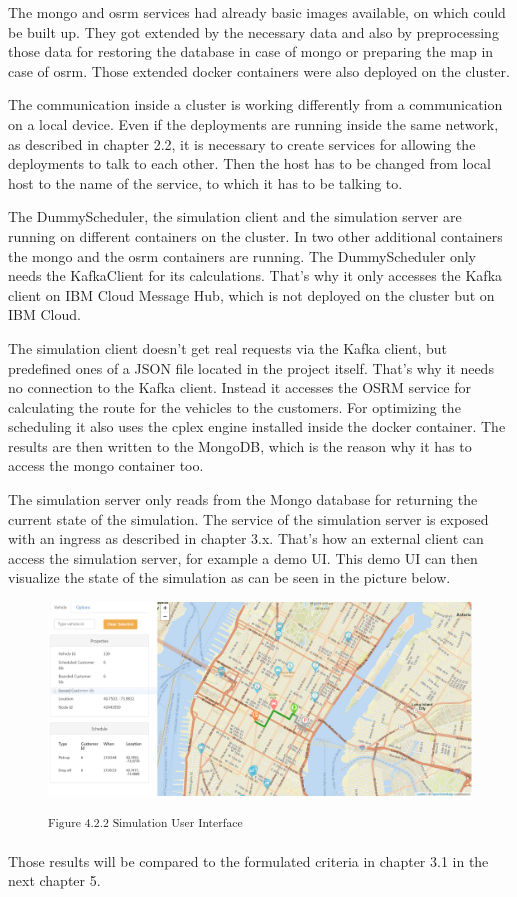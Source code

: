 The mongo and osrm services had already basic images available, on which could be built up. They got extended by the necessary data and also by preprocessing those data for restoring the database in case of mongo or preparing the map in case of osrm. Those extended docker containers were also deployed on the cluster.

The communication inside a cluster is working differently from a communication on a local device. Even if the deployments are running inside the same network, as described in chapter 2.2, it is necessary to create services for allowing the deployments to talk to each other. Then the host has to be changed from local host to the name of the service, to which it has to be talking to.


The DummyScheduler, the simulation client and the simulation server are running on different containers on the cluster. In two other additional containers the mongo and the osrm containers are running. The DummyScheduler only needs the KafkaClient for its calculations. That's why it only accesses the Kafka client on IBM Cloud Message Hub, which is not deployed on the cluster but on IBM Cloud.

The simulation client doesn't get real requests via the Kafka client, but predefined ones of a JSON file located in the project itself. That's why it needs no connection to the Kafka client. Instead it accesses the OSRM service for calculating the route for the vehicles to the customers. For optimizing the scheduling it also uses the cplex engine installed inside the docker container. The results are then written to the MongoDB, which is the reason why it has to access the mongo container too. 

The simulation server only reads from the Mongo database for returning the current state of the simulation. The service of the simulation server is exposed with an ingress as described in chapter 3.x. That's how an external client can access the simulation server, for example a demo UI. This demo UI can then visualize the state of the simulation as can be seen in the picture below.

\begin{figure}[h]
\centering
\includegraphics[width=\textwidth/5*4]{images/simulation_ui.png}

\textsuperscript{Figure 4.2.2 Simulation User Interface}\\
\end{figure}

Those results will be compared to the formulated criteria in chapter 3.1 in the next chapter 5.